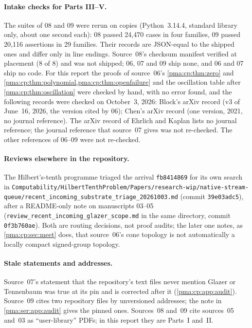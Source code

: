 \documentclass[11pt]{article}
\numberwithin{equation}{section}
\theoremstyle{definition}
\theoremstyle{remark}
\newcommand{\fn}[1]{\nolinkurl{#1}}
\begin{document}
\paragraph{Intake checks for Parts III--V.} The suites of 08 and 09 were rerun
on copies (Python~3.14.4, standard library only, about one second each): 08
passed 24{,}470 cases in four families, 09 passed 20{,}116 assertions in 29
families. Their records are JSON-equal to the shipped ones and differ only in
line endings. Source~08's checksum manifest verified at placement (8 of 8)
and was not shipped; 06, 07 and 09 ship none, and 06 and 07 ship no code. For
this report the proofs of source~06's \cref{pma:cp:thm:zero} and
\cref{pma:cp:thm:polynomial,pma:cp:thm:openfailure} and the oscillation table
after \cref{pma:cp:thm:oscillation} were checked by hand, with no error found,
and the following records were checked on October~3, 2026: Block's arXiv
record (v3 of June~16, 2026, the version cited by 06); Chen's arXiv record
(one version, 2021, no journal reference). The arXiv record of Ehrlich and
Kaplan lists no journal reference; the journal reference that source~07 gives
was not re-checked. The other references of 06--09 were not re-checked.

\paragraph{Reviews elsewhere in the repository.} The Hilbert's-tenth
programme triaged the arrival \texttt{fb8414869} for its own search in
\fn{Computability/HilbertTenthProblem/Papers/research-wip/native-stream-queue/recent_incoming_substrate_triage_20261003.md}
(commit \texttt{39e03adc5}), after a README-only note on manuscripts 03--05
(\fn{review_recent_incoming_glazer_scope.md} in the same directory, commit
\texttt{0f3b760ae}). Both are routing decisions, not proof audits; the later
one notes, as \cref{pma:cp:sec:meet} does, that source~06's cone topology is
not automatically a locally compact signed-group topology.

\paragraph{Stale statements and addresses.} Source~07's statement that the
repository's text files never mention Glazer or Tennenbaum was true at its
pin and is corrected after it (\cref{pma:cp:app:audit}). Source~09 cites two
repository files by unversioned addresses; the note in \cref{pma:ser:app:audit}
gives the pinned ones. Sources~08 and~09 cite sources~05 and~03 as
``user-library'' PDFs; in this report they are Parts~I and~II.
\end{document}
